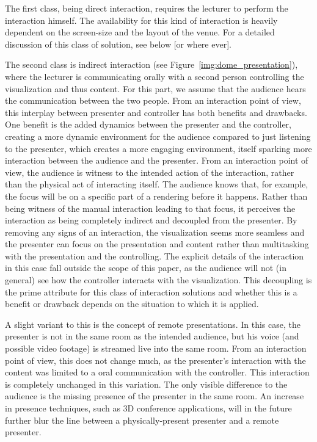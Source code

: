 \documentclass[review,journal]{vgtc}         %
\begin{document}
The first class, being direct interaction, requires the lecturer to perform the interaction himself.
The availability for this kind of interaction is heavily dependent on the screen-size and the layout of the venue.
For a detailed discussion of this class of solution, see below [or where ever].

The second class is indirect interaction (see Figure~\ref{img:dome_presentation}), where the lecturer is communicating orally with a second person controlling the visualization and thus content.
For this part, we assume that the audience hears the communication between the two people.
From an interaction point of view, this interplay between presenter and controller has both benefits and drawbacks.
One benefit is the added dynamics between the presenter and the controller, creating a more dynamic environment for the audience compared to just listening to the presenter, which creates a more engaging environment, itself sparking more interaction between the audience and the presenter.
From an interaction point of view, the audience is witness to the intended action of the interaction, rather than the physical act of interacting itself.
The audience knows that, for example, the focus will be on a specific part of a rendering before it happens.
Rather than being witness of the manual interaction leading to that focus, it perceives the interaction as being completely indirect and decoupled from the presenter.
By removing any signs of an interaction, the visualization seems more seamless and the presenter can focus on the presentation and content rather than multitasking with the presentation and the controlling.
The explicit details of the interaction in this case fall outside the scope of this paper, as the audience will not (in general) see how the controller interacts with the visualization.
This decoupling is the prime attribute for this class of interaction solutions and whether this is a benefit or drawback depends on the situation to which it is applied.

A slight variant to this is the concept of remote presentations.
In this case, the presenter is not in the same room as the intended audience, but his voice (and possible video footage) is streamed live into the same room.
From an interaction point of view, this does not change much, as the presenter's interaction with the content was limited to a oral communication with the controller.
This interaction is completely unchanged in this variation.
The only visible difference to the audience is the missing presence of the presenter in the same room.
An increase in presence techniques, such as 3D conference applications, will in the future further blur the line between a physically-present presenter and a remote presenter.
\end{document}
